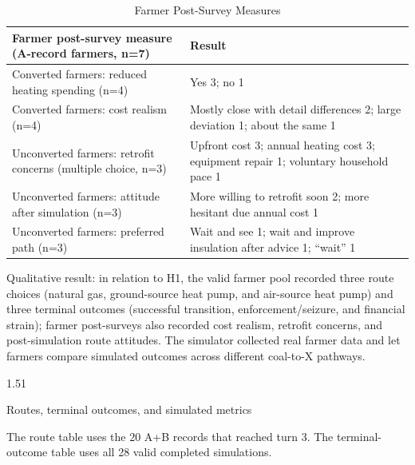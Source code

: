 \documentclass[stu,12pt,floatsintext,donotrepeattitle]{apa7}
\makeatletter
\newcommand{\Sihao}{\fontsize{14pt}{18pt}\selectfont}
\renewcommand{\subsection}{\@startsection{subsection}{2}{\z@}%
  {1.5\baselineskip}{1\baselineskip}%
  {\normalfont\Sihao\bfseries\raggedright}}
\makeatother
\begin{document}
\begin{table}[htbp]
\centering
\footnotesize
\begin{tabularx}{\textwidth}{@{}P{0.42\textwidth}X@{}}
\toprule
Farmer post-survey measure (A-record farmers, n=7) & Result \\
\midrule
Converted farmers: reduced heating spending (n=4) & Yes 3; no 1 \\
Converted farmers: cost realism (n=4) & Mostly close with detail differences 2; large deviation 1; about the same 1 \\
Unconverted farmers: retrofit concerns (multiple choice, n=3) & Upfront cost 3; annual heating cost 3; equipment repair 1; voluntary household pace 1 \\
Unconverted farmers: attitude after simulation (n=3) & More willing to retrofit soon 2; more hesitant due annual cost 1 \\
Unconverted farmers: preferred path (n=3) & Wait and see 1; wait and improve insulation after advice 1; ``wait'' 1 \\
\bottomrule
\end{tabularx}
\caption{Farmer Post-Survey Measures}
\label{tab:farmer-postsurvey}
\end{table}

Qualitative result: in relation to H1, the valid farmer pool recorded three route choices (natural gas, ground-source heat pump, and air-source heat pump) and three terminal outcomes (successful transition, enforcement/seizure, and financial strain); farmer post-surveys also recorded cost realism, retrofit concerns, and post-simulation route attitudes. The simulator collected real farmer data and let farmers compare simulated outcomes across different coal-to-X pathways.

\subsection{Routes, terminal outcomes, and simulated metrics}

The route table uses the 20 A+B records that reached turn 3. The terminal-outcome table uses all 28 valid completed simulations.

\begin{table}[H]
\centering
\scriptsize
\setlength{\tabcolsep}{2pt}
\caption{Simulated Metrics by Technology Route}
\label{tab:metrics-by-route}
\end{table}
\end{document}
